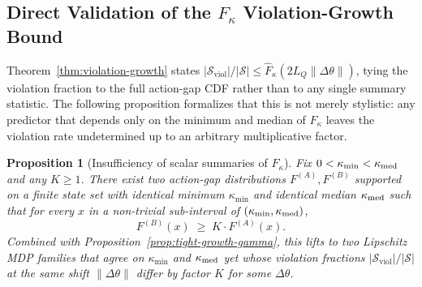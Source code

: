 \documentclass{article}
\newtheorem{proposition}{Proposition}
\newcommand{\cS}{\mathcal{S}}
\newcommand{\Sviol}{\mathcal{S}_{\mathrm{viol}}}
\begin{document}
\subsection{Direct Validation of the \texorpdfstring{$F_\kappa$}{F\_kappa} Violation-Growth Bound}
\label{app:fkappa-bound}

Theorem~\ref{thm:violation-growth} states $|\Sviol|/|\cS| \leq \hat F_\kappa(2L_Q\|\Delta\theta\|)$, tying the violation fraction to the full action-gap CDF rather than to any single summary statistic. The following proposition formalizes that this is not merely stylistic: any predictor that depends only on the minimum and median of $F_\kappa$ leaves the violation rate undetermined up to an arbitrary multiplicative factor.

\begin{proposition}[Insufficiency of scalar summaries of $F_\kappa$]
\label{prop:fkappa-necessity}
Fix $0 < \kappa_{\min} < \kappa_{\rm med}$ and any $K \geq 1$. There exist two action-gap distributions $F^{(A)}, F^{(B)}$ supported on a finite state set with identical minimum $\kappa_{\min}$ and identical median $\kappa_{\rm med}$ such that for every $x$ in a non-trivial sub-interval of $(\kappa_{\min}, \kappa_{\rm med})$,
\[
F^{(B)}(x) \;\geq\; K \cdot F^{(A)}(x).
\]
Combined with Proposition~\ref{prop:tight-growth-gamma}, this lifts to two Lipschitz MDP families that agree on $\kappa_{\min}$ and $\kappa_{\rm med}$ yet whose violation fractions $|\Sviol|/|\cS|$ at the same shift $\|\Delta\theta\|$ differ by factor $K$ for some $\Delta\theta$.
\end{proposition}
\end{document}
